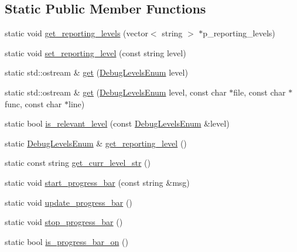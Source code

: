\subsection*{Static Public Member Functions}
\begin{DoxyCompactItemize}
\item 
static void \hyperlink{classuva_1_1utils_1_1logging_1_1_logger_a480058c384ec3c8438b52b6ae8ce7608}{get\+\_\+reporting\+\_\+levels} (vector$<$ string $>$ $\ast$p\+\_\+reporting\+\_\+levels)
\item 
static void \hyperlink{classuva_1_1utils_1_1logging_1_1_logger_ac115ef9f3ddf667e9f7d0c9c00fcd655}{set\+\_\+reporting\+\_\+level} (const string level)
\item 
static std\+::ostream \& \hyperlink{classuva_1_1utils_1_1logging_1_1_logger_a508164fb7011996a73bec01ad30465ce}{get} (\hyperlink{namespaceuva_1_1utils_1_1logging_afe529dbf8d7fef2c75698798ec3e65e7}{Debug\+Levels\+Enum} level)
\item 
static std\+::ostream \& \hyperlink{classuva_1_1utils_1_1logging_1_1_logger_aaeb7427ead2050328341260ef044fcf5}{get} (\hyperlink{namespaceuva_1_1utils_1_1logging_afe529dbf8d7fef2c75698798ec3e65e7}{Debug\+Levels\+Enum} level, const char $\ast$file, const char $\ast$func, const char $\ast$line)
\item 
static bool \hyperlink{classuva_1_1utils_1_1logging_1_1_logger_aee3c68042685ec6d11f8ceac204aabb3}{is\+\_\+relevant\+\_\+level} (const \hyperlink{namespaceuva_1_1utils_1_1logging_afe529dbf8d7fef2c75698798ec3e65e7}{Debug\+Levels\+Enum} \&level)
\item 
static \hyperlink{namespaceuva_1_1utils_1_1logging_afe529dbf8d7fef2c75698798ec3e65e7}{Debug\+Levels\+Enum} \& \hyperlink{classuva_1_1utils_1_1logging_1_1_logger_a79759a95b580c0e3673db54a345fccbb}{get\+\_\+reporting\+\_\+level} ()
\item 
static const string \hyperlink{classuva_1_1utils_1_1logging_1_1_logger_a81a7f436b3b5141685baeebc6142c98c}{get\+\_\+curr\+\_\+level\+\_\+str} ()
\item 
static void \hyperlink{classuva_1_1utils_1_1logging_1_1_logger_aa99de82f99b69d0fcc801e1cdd027cef}{start\+\_\+progress\+\_\+bar} (const string \&msg)
\item 
static void \hyperlink{classuva_1_1utils_1_1logging_1_1_logger_a7fcd67ede67ecb486da76d3788f39388}{update\+\_\+progress\+\_\+bar} ()
\item 
static void \hyperlink{classuva_1_1utils_1_1logging_1_1_logger_aee80ead21adb144d08addd017c09d674}{stop\+\_\+progress\+\_\+bar} ()
\item 
static bool \hyperlink{classuva_1_1utils_1_1logging_1_1_logger_ab7b30f96654aebda8fa046fc5a15c339}{is\+\_\+progress\+\_\+bar\+\_\+on} ()
\end{DoxyCompactItemize}


